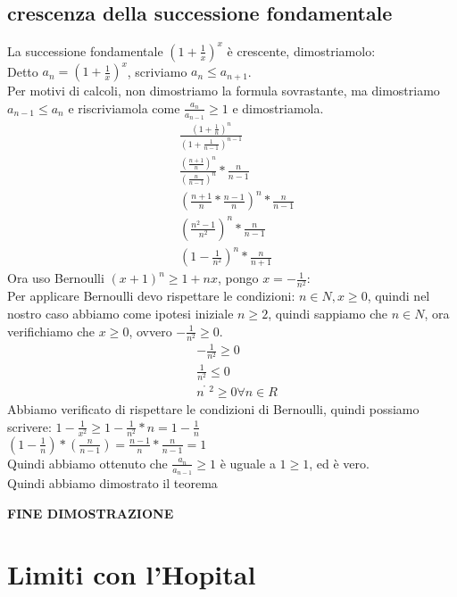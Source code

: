 \documentclass[11pt]{article}
\begin{document}
\subsection{crescenza della successione fondamentale}
La successione fondamentale $(1+\frac{1}{x})^{x}$ è crescente, dimostriamolo:\\
Detto $a_{n} = (1+\frac{1}{x})^{x}$, scriviamo $a_{n} \le a_{n+1}$.\\
Per motivi di calcoli, non dimostriamo la formula sovrastante, ma dimostriamo $a_{n-1} \le a_{n}$ e 
riscriviamola come $\frac{a_{n}}{a_{n-1}} \ge 1$ e dimostriamola.\\
\begin{align*}
    &\frac{(1+\frac{1}{n})^{n}}{(1+\frac{1}{n-1})^{n-1}}\\
    &\frac{(\frac{n+1}{n})^{n}}{(\frac{n}{n-1})^{n}} * \frac{n}{n-1}\\
    &(\frac{n+1}{n}*\frac{n-1}{n})^{n}*\frac{n}{n-1}\\
    &(\frac{n^{2}-1}{n^{2}})^{n}* \frac{n}{n-1}\\
    &(1- \frac{1}{n^{2}})^{n}*\frac{n}{n+1}
\end{align*}
Ora uso Bernoulli $(x+1)^{n} \ge 1 +nx$, pongo $x = -\frac{1}{n^{2}}$:\\
Per applicare Bernoulli devo rispettare le condizioni: $n \in N, x \ge 0$, quindi nel nostro caso abbiamo come 
ipotesi iniziale $n \ge 2$, quindi sappiamo che $n \in N$, ora verifichiamo che $x \ge 0$, ovvero $-\frac{1}{n^{2}} \ge 0$.\\
\begin{align*}
    &-\frac{1}{n^{2}} \ge 0\\
    &\frac{1}{n^{2}} \le 0\\
    &n^{̊2} \ge 0 \forall n \in R
\end{align*}
Abbiamo verificato di rispettare le condizioni di Bernoulli, quindi possiamo scrivere: $1 - \frac{1}{x^{2}} \ge 1 - \frac{1}{n^{2}}*n = 1 - \frac{1}{n}$\\
$(1 - \frac{1}{n})*(\frac{n}{n-1}) = \frac{n-1}{n}*\frac{n}{n-1} = 1$\\
Quindi abbiamo ottenuto che $\frac{a_{n}}{a_{n-1}} \ge 1$ è uguale a $1 \ge 1$, ed è vero.\\
Quindi abbiamo dimostrato il teorema\\
\begin{center}
    \textbf{FINE DIMOSTRAZIONE}
\end{center}
\section{Limiti con l'Hopital}
\end{document}
